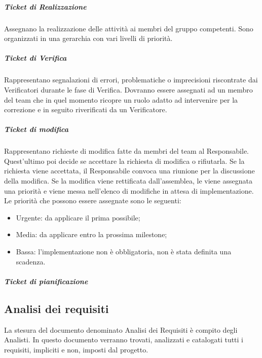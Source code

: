 \subparagraph{Ticket di Realizzazione \\}
\label{8.4.2}
Assegnano la realizzazione delle attività ai membri del gruppo competenti. Sono organizzati in una gerarchia con vari livelli di priorità.

\subparagraph{Ticket di Verifica \\}
\label{8.4.3}
Rappresentano segnalazioni di errori, problematiche o imprecisioni riscontrate dai Verificatori durante le fase di Verifica. Dovranno essere assegnati ad un membro del team che in quel momento ricopre un ruolo adatto ad intervenire per la correzione e in seguito riverificati da un Verificatore.


\subparagraph{Ticket di modifica \\}
\label{8.4.4}
Rappresentano richieste di modifica fatte da membri del team al Responsabile. Quest'ultimo poi decide se accettare la richiesta di modifica o rifiutarla. Se la richiesta viene accettata, il Responsabile convoca una riunione per la discussione della modifica. Se la modifica viene rettificata dall'assemblea, le viene assegnata una priorità e viene messa nell'elenco di modifiche in attesa di implementazione.
Le priorità che possono essere assegnate sono le seguenti:
\begin{itemize}
\item Urgente: da applicare il prima possibile;
\item Media: da applicare entro la prossima milestone;
\item Bassa: l'implementazione non è obbligatoria, non è stata definita una scadenza.
\end{itemize}

\subparagraph{Ticket di pianificazione \\}

\subsection{Analisi dei requisiti}
\label{6.1}
La stesura del documento denominato Analisi dei Requisiti è compito degli Analisti.
In questo documento verranno trovati, analizzati e catalogati tutti i requisiti, impliciti e non, imposti dal progetto.

